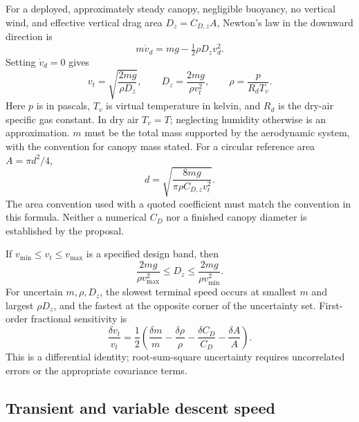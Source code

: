 \documentclass[11pt,a4paper]{article}
\numberwithin{equation}{section}
\begin{document}
For a deployed, approximately steady canopy, negligible buoyancy, no
vertical wind, and effective vertical drag area $D_z=C_{D,z}A$, Newton's
law in the downward direction is
\begin{equation}
 m\dot v_d=mg-\tfrac12\rho D_z v_d^2.
\end{equation}
Setting $\dot v_d=0$ gives
\begin{equation}
 v_t=\sqrt{\frac{2mg}{\rho D_z}},\qquad
 D_z=\frac{2mg}{\rho v_t^2},\qquad
 \rho=\frac{p}{R_dT_v}.
\end{equation}
Here $p$ is in pascals, $T_v$ is virtual temperature in kelvin, and
$R_d$ is the dry-air specific gas constant. In dry air $T_v=T$; neglecting
humidity otherwise is an approximation. $m$ must be the total mass supported
by the aerodynamic system, with the convention for canopy mass stated.
For a circular reference area $A=\pi d^2/4$,
\begin{equation}
 d=\sqrt{\frac{8mg}{\pi\rho C_{D,z}v_t^2}}.
\end{equation}
The area convention used with a quoted coefficient must match the convention
in this formula. Neither a numerical $C_D$ nor a finished canopy diameter is
established by the proposal.

If $v_{\min}\leq v_t\leq v_{\max}$ is a specified design band, then
\begin{equation}
 \frac{2mg}{\rho v_{\max}^2}\leq D_z
 \leq\frac{2mg}{\rho v_{\min}^2}.
\end{equation}
For uncertain $m,\rho,D_z$, the slowest terminal speed occurs at smallest
$m$ and largest $\rho D_z$, and the fastest at the opposite corner of the
uncertainty set. First-order fractional sensitivity is
\begin{equation}
 \frac{\delta v_t}{v_t}
 =\frac12\left(\frac{\delta m}{m}-\frac{\delta\rho}{\rho}
 -\frac{\delta C_D}{C_D}-\frac{\delta A}{A}\right).
\end{equation}
This is a differential identity; root-sum-square uncertainty requires
uncorrelated errors or the appropriate covariance terms.

\subsection{Transient and variable descent speed}
\end{document}
